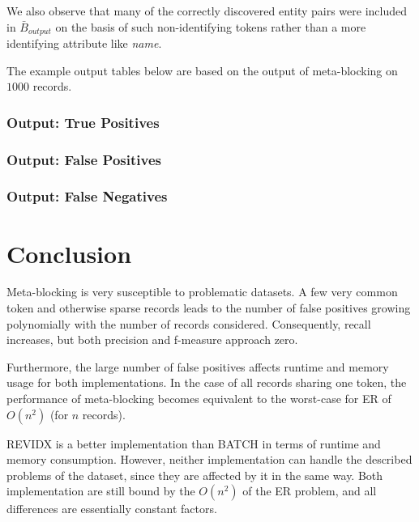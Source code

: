 \documentclass[a4paper,12pt]{article}
\begin{document}
We also observe that many of the correctly discovered entity pairs were included in $\bar B_{output}$ on the basis of such non-identifying tokens rather than a more identifying attribute like \emph{name}.

The example output tables below are based on the output of meta-blocking on $1000$ records.

\subsubsection{Output: True Positives}


\subsubsection{Output: False Positives}


\subsubsection{Output: False Negatives}


\section{Conclusion}
Meta-blocking is very susceptible to problematic datasets. A few very common token and otherwise sparse records leads to the number of false positives growing polynomially with the number of records considered. Consequently, recall increases, but both precision and f-measure approach zero.

Furthermore, the large number of false positives affects runtime and memory usage for both implementations. In the case of all records sharing one token, the performance of meta-blocking becomes equivalent to the worst-case for ER of $O(n^{2})$ (for $n$ records).

REVIDX is a better implementation than BATCH in terms of runtime and memory consumption. However, neither implementation can handle the described problems of the dataset, since they are affected by it in the same way. Both implementation are still bound by the $O(n^{2})$ of the ER problem, and all differences are essentially constant factors.



\end{document}
